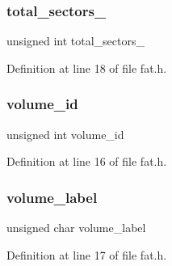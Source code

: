 \subsubsection{\texorpdfstring{total\+\_\+sectors\+\_}{total\_sectors\_32}}
{\footnotesize\ttfamily unsigned int total\+\_\+sectors\+\_}



Definition at line 18 of file fat.\+h.

\mbox{\label{a00158_a35fa9e629267c027e1e46e4b354b6764_a35fa9e629267c027e1e46e4b354b6764}} 
\subsubsection{\texorpdfstring{volume\+\_\+id}{volume\_id}}
{\footnotesize\ttfamily unsigned int volume\+\_\+id}



Definition at line 16 of file fat.\+h.

\mbox{\label{a00158_ac1eef402f95fa102ed4c38f0c791c1c1_ac1eef402f95fa102ed4c38f0c791c1c1}} 
\subsubsection{\texorpdfstring{volume\+\_\+label}{volume\_label}}
{\footnotesize\ttfamily unsigned char volume\+\_\+label}



Definition at line 17 of file fat.\+h.

